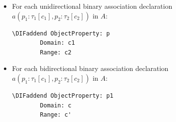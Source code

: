 \documentclass[10pt,fleqn,final]{scrreprt}
\newenvironment{definitions}[0]{\medskip }{}
\providecommand{\DIFaddbegin}{} %
\providecommand{\DIFaddend}{} %
\providecommand{\DIFdelbegin}{} %
\providecommand{\DIFdelend}{} %
\begin{document}
\begin{definitions}
\begin{itemize}
\item For each unidirectional binary association declaration $a(p_1:\tau_1[c_1],p_2:\tau_2[c_2])$ in $A$:
\DIFdelbegin %
\DIFdelend \DIFaddbegin \begin{lstlisting}[language=owl2Manchester]
	\DIFaddend ObjectProperty: p
		Domain: c1
		Range: c2
\end{lstlisting}
\item For each bidirectional binary association declaration $a(p_1:\tau_1[c_1],p_2:\tau_2[c_2])$ in $A$:
\DIFdelbegin %
\DIFdelend \DIFaddbegin \begin{lstlisting}[language=owl2Manchester]
	\DIFaddend ObjectProperty: p1
		Domain: c
		Range: c'


\end{lstlisting}
\end{itemize}
\end{definitions}
\end{document}
